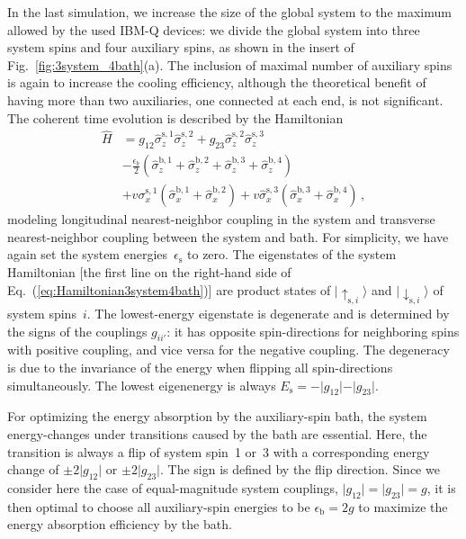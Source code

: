 \documentclass[twocolumn,amsmath,amssymb,pra]{revtex4-2}
\begin{document}
In the last simulation, we increase the size of the global system to the maximum allowed by the used IBM-Q devices:
we divide the global system into three system spins and four auxiliary spins, as shown in the insert of Fig.~\ref{fig:3system_4bath}(a).
The inclusion of maximal number of auxiliary spins is again to increase the cooling efficiency,
although the theoretical benefit of having more than two auxiliaries, one connected at each end, is not significant.
The coherent time evolution is described by the Hamiltonian
\begin{align}\label{eq:Hamiltonian3system4bath}
\hat H &=  g_{12}\hat\sigma_z^{\textrm{s},1}\hat\sigma_z^{\textrm{s},2} + g_{23}\hat\sigma_z^{\textrm{s},2}\hat\sigma_z^{\textrm{s},3} \nonumber \\
&-\frac{\epsilon_{b}}{2}\left(\hat\sigma_z^{\textrm{b},1} + \hat\sigma_z^{\textrm{b},2} + \hat\sigma_z^{\textrm{b},3} + \hat\sigma_z^{\textrm{b},4}\right) \nonumber \\
 & + v\sigma_x^{\textrm{s},1}\left(\hat\sigma_x^{\textrm{b},1}  + \hat\sigma_x^{\textrm{b},2}\right) + v\hat\sigma_x^{\textrm{s},3}\left(\hat\sigma_x^{\textrm{b},3} + \hat\sigma_x^{\textrm{b},4}\right) \, ,
\end{align}
modeling longitudinal nearest-neighbor coupling in the system and
transverse nearest-neighbor coupling between the system and bath. For simplicity, we have again set the system energies~$\epsilon_\textrm{s}$ to zero.
The eigenstates of the system Hamiltonian [the first line on the right-hand side of Eq.~(\ref{eq:Hamiltonian3system4bath})]
are product states of $\lvert\uparrow_{\textrm{s},i}\rangle$ and $\lvert\downarrow_{\textrm{s},i} \rangle$ of system spins~$i$.
The lowest-energy eigenstate is degenerate and is determined by the signs of the couplings $g_{ii'}$:
it has opposite spin-directions for neighboring spins with positive coupling,
and vice versa for the negative coupling.
The degeneracy is due to the invariance of the energy when flipping all spin-directions simultaneously.
The lowest eigenenergy is always $E_\textrm{s} = -\vert g_{12}\vert  -\vert g_{23}\vert $.

For optimizing the energy absorption by the auxiliary-spin bath,
the system energy-changes under transitions caused by the bath are essential.
Here, the transition is always a flip of system spin~1 or~3 with a corresponding energy change of $\pm 2\vert g_{12}\vert $ or $\pm 2\vert g_{23}\vert$.
The sign is defined by the flip direction.
Since we consider here the case of equal-magnitude system couplings, $\vert g_{12}\vert = \vert g_{23}\vert = g$,
it is then optimal to choose all auxiliary-spin energies to be
$\epsilon_{\textrm{b}} = 2 g$ to maximize the energy absorption efficiency by the bath.
\end{document}
